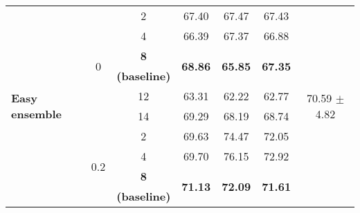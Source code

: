 \begin{sidewaystable}
\begin{adjustbox}{totalheight=0.85\textheight, width=\textwidth, keepaspectratio}
\begin{tabularx}{1.4\textwidth}{Xcccccc}
\multirow{18}{=}{\textbf{Easy ensemble}}               & \multirow{6}{*}{0}    & 2                        & 67.40                            & 67.47                           & 67.43                           & \multirow{18}{*}{70.59 $\pm$ 4.82}  \\ 
                                                       &                       & 4                        & 66.39                           & 67.37                           & 66.88                           &                                 \\ 
                                                       &                       & \textbf{8}               & \multirow{2}{*}{\textbf{68.86}} & \multirow{2}{*}{\textbf{65.85}} & \multirow{2}{*}{\textbf{67.35}} &                                 \\
                                                       &                       & \textbf{(baseline)}      &                                 &                                 &                                 &                                 \\ 
                                                       &                       & 12                       & 63.31                           & 62.22                           & 62.77                           &                                 \\ 
                                                       &                       & 14                       & 69.29                           & 68.19                           & 68.74                           &                                 \\ 
                                                       & \multirow{6}{*}{0.2}  & 2                        & 69.63                           & 74.47                           & 72.05                           &                                 \\ 
                                                       &                       & 4                        & 69.70                            & 76.15                           & 72.92                           &                                 \\ 
                                                       &                       & \textbf{8}               & \multirow{2}{*}{\textbf{71.13}} & \multirow{2}{*}{\textbf{72.09}} & \multirow{2}{*}{\textbf{71.61}} &                                 \\
                                                       &                       & \textbf{(baseline)}      &                                 &                                 &                                 &                                 \\ 

\end{tabularx}
\end{adjustbox}
\end{sidewaystable}

